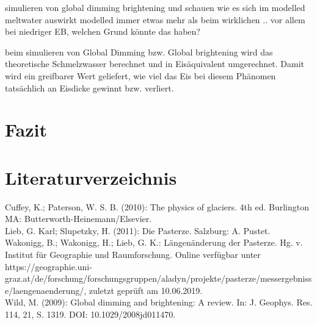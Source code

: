\documentclass[12pt,a4paper]{article}
\begin{document}
simulieren von global dimming brightening und schauen wie es sich im modelled meltwater auswirkt
modelled immer etwas mehr als beim wirklichen .. vor allem bei niedriger EB, welchen Grund könnte das haben?

beim simulieren von Global Dimming bzw. Global brightening wird das theoretische Schmelzwasser berechnet und in Eisäquivalent umgerechnet. Damit wird ein greifbarer Wert geliefert, wie viel das Eis bei diesem Phänomen tatsächlich an Eisdicke gewinnt bzw. verliert.




\pagebreak
\section{Fazit}


\section{Literaturverzeichnis}
Cuffey, K.; Paterson, W. S. B. (2010): The physics of glaciers. 4th ed. Burlington MA: Butterworth-Heinemann/Elsevier.\\

Lieb, G. Karl; Slupetzky, H. (2011): Die Pasterze. Salzburg: A. Pustet.\\

Wakonigg, B.; Wakonigg, H.; Lieb, G. K.: Längenänderung der Pasterze. Hg. v. Institut für Geographie und Raumforschung. Online verfügbar unter https://geographie.uni-graz.at/de/forschung/forschungsgruppen/aladyn/projekte/pasterze/messergebnisse/laengenaenderung/, zuletzt geprüft am 10.06.2019.\\

Wild, M. (2009): Global dimming and brightening: A review. In: J. Geophys. Res. 114, 21, S. 1319. DOI: 10.1029/2008jd011470.
\end{document}
